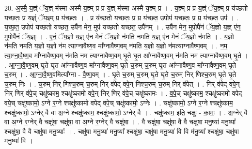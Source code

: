\documentclass[17pt]{extarticle}
\begin{document}
20. अ॒स्मै॒ य॒ज्ञ्ं ॅय॒ज्ञ् म॑स्मा अस्मै य॒ज्ञ्म् प्र प्र य॒ज्ञ् म॑स्मा अस्मै य॒ज्ञ्म् प्र । . य॒ज्ञ्म् प्र प्र य॒ज्ञ्ं ॅय॒ज्ञ्म् प्र य॑च्छतो यच्छतः॒ प्र य॒ज्ञ्ं ॅय॒ज्ञ्म् प्र य॑च्छतः । . प्र य॑च्छतो यच्छतः॒ प्र प्र य॑च्छत॒ उपोप॑ यच्छतः॒ प्र प्र य॑च्छत॒ उप॑ । . य॒च्छ॒त॒ उपोप॑ यच्छतो यच्छत॒ उपै॑न मेन॒ मुप॑ यच्छतो यच्छत॒ उपै॑नम् । . उपै॑न मेन॒ मुपोपै॑नं ॅय॒ज्ञो य॒ज्ञ् ए॑न॒ मुपोपै॑नं ॅय॒ज्ञ्ः । . ए॒नं॒ ॅय॒ज्ञो य॒ज्ञ् ए॑न मेनं ॅय॒ज्ञो न॑मति नमति य॒ज्ञ् ए॑न मेनं ॅय॒ज्ञो न॑मति । . य॒ज्ञो न॑मति नमति य॒ज्ञो य॒ज्ञो न॑म त्याग्नावैष्ण॒व मा᳚ग्नावैष्ण॒वम् न॑मति य॒ज्ञो य॒ज्ञो न॑मत्याग्नावैष्ण॒वम् । . न॒म॒ त्या॒ग्ना॒वै॒ष्ण॒व मा᳚ग्नावैष्ण॒वम् न॑मति नम त्याग्नावैष्ण॒वम् घृ॒ते घृ॒त आ᳚ग्नावैष्ण॒वम् न॑मति नम त्याग्नावैष्ण॒वम् घृ॒ते । . आ॒ग्ना॒वै॒ष्ण॒वम् घृ॒ते घृ॒त आ᳚ग्नावैष्ण॒व मा᳚ग्नावैष्ण॒वम् घृ॒ते च॒रुम् च॒रुम् घृ॒त आ᳚ग्नावैष्ण॒व मा᳚ग्नावैष्ण॒वम् घृ॒ते च॒रुम् । . आ॒ग्ना॒वै॒ष्ण॒वमित्या᳚ग्ना - वै॒ष्ण॒वम् । . घृ॒ते च॒रुम् च॒रुम् घृ॒ते घृ॒ते च॒रुम् निर् णिश्च॒रुम् घृ॒ते घृ॒ते च॒रुम् निः । . च॒रुम् निर् णिश्च॒रुम् च॒रुम् निर् व॑पेद् वपे॒न् निश्च॒रुम् च॒रुम् निर् व॑पेत् । . निर् व॑पेद् वपे॒न् निर् णिर् व॑पे॒च् चक्षु॑ष्काम॒ श्चक्षु॑ष्कामो वपे॒न् निर् णिर् व॑पे॒च् चक्षु॑ष्कामः । . व॒पे॒च् चक्षु॑ष्काम॒ श्चक्षु॑ष्कामो वपेद् वपे॒च् चक्षु॑ष्कामो॒ ऽग्ने र॒ग्ने श्चक्षु॑ष्कामो वपेद् वपे॒च् चक्षु॑ष्कामो॒ ऽग्नेः । . चक्षु॑ष्कामो॒ ऽग्ने र॒ग्ने श्चक्षु॑ष्काम॒ श्चक्षु॑ष्कामो॒ ऽग्नेर् वै वा अ॒ग्ने श्चक्षु॑ष्काम॒ श्चक्षु॑ष्कामो॒ ऽग्नेर् वै । . चक्षु॑ष्काम॒ इति॒ चक्षुः॑ - का॒मः॒ । . अ॒ग्नेर् वै वा अ॒ग्ने र॒ग्नेर् वै चक्षु॑षा॒ चक्षु॑षा॒ वा अ॒ग्ने र॒ग्नेर् वै चक्षु॑षा । . वै चक्षु॑षा॒ चक्षु॑षा॒ वै वै चक्षु॑षा मनु॒ष्या॑ मनु॒ष्या᳚ श्चक्षु॑षा॒ वै वै चक्षु॑षा मनु॒ष्याः᳚ । . चक्षु॑षा मनु॒ष्या॑ मनु॒ष्या᳚ श्चक्षु॑षा॒ चक्षु॑षा मनु॒ष्या॑ वि वि म॑नु॒ष्या᳚ श्चक्षु॑षा॒ चक्षु॑षा मनु॒ष्या॑ वि । \newline
\end{document}
